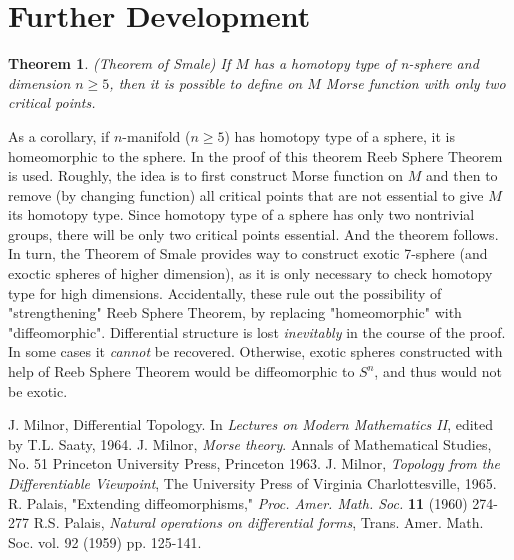 \documentclass[8pt]{article} %
\newtheorem{theorem}{Theorem}
\begin{document}
\section{Further Development}
\begin{theorem}{(Theorem of Smale) }If $M$ has a homotopy type of n-sphere and dimension $n\geq 5$, then it is possible to define on $M$ Morse function with only two critical points.
\end{theorem}
As a corollary, if $n$-manifold ($n\geq 5$) has homotopy type of a sphere, it is homeomorphic to the sphere. In the proof of this theorem Reeb Sphere Theorem is used. Roughly, the idea is to first construct Morse function on $M$ and
then to remove (by changing function) all critical points that are not essential to give $M$ its homotopy type. Since homotopy type of a sphere has only two nontrivial groups, there will be only two critical points essential. 
And the theorem follows.\\
In turn, the Theorem of Smale provides way to construct exotic 7-sphere (and exoctic spheres of higher dimension), as it is only necessary to check homotopy type for high dimensions. Accidentally, these rule out the possibility of "strengthening" Reeb Sphere Theorem, by replacing "homeomorphic"
with "diffeomorphic". Differential structure is lost \textit{inevitably} in the course of the proof. In some cases it \textit{cannot} be recovered.
Otherwise, exotic spheres constructed with help of Reeb Sphere Theorem would be diffeomorphic to $S^n$, and thus would not be exotic.
\begin{thebibliography}{9}
	J. Milnor, Differential Topology. In {\em Lectures on Modern Mathematics II}, edited by T.L. Saaty, 1964.
	 J. Milnor, {\em Morse theory}. Annals of Mathematical Studies, No. 51 Princeton University Press, Princeton 1963.
	 J. Milnor, {\em Topology from the Differentiable Viewpoint}, The University Press of Virginia Charlottesville, 1965.
	 R. Palais, "Extending diffeomorphisms," {\em Proc. Amer. Math. Soc.} \textbf{11} (1960) 274-277
	 R.S. Palais, {\em Natural operations on differential forms}, Trans. Amer. Math. Soc. vol. 92 (1959) pp. 125-141.
\end{thebibliography}
\end{document}
